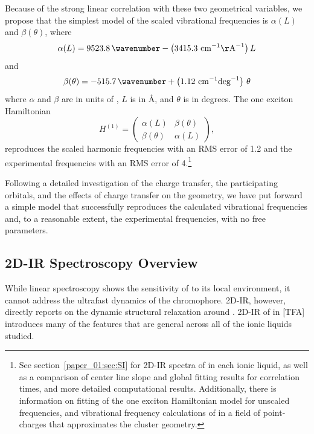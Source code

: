 {Because of the strong linear correlation with these two geometrical variables,  we propose that the simplest model of the scaled vibrational frequencies is \(\alpha(L)\) and \(\beta(\theta)\), where
\begin{equation}
  \alpha(L) = \SI{9523.8}{\wavenumber} - \left(3415.3~\mathrm{cm}^{-1} \mathrm{\AA}^{-1}\right) L %
\end{equation}
and
\begin{equation}
  \beta(\theta) = \SI{-515.7}{\wavenumber} + \left(1.12~\mathrm{cm}^{-1} \mathrm{deg}^{-1}\right)\, \theta  %
\end{equation}
where $\alpha$ and \(\beta\) are in units of \si{\wavenumber}, \(L\) is in \si{\angstrom}, and \(\theta\) is in degrees. The one exciton Hamiltonian
\begin{equation}
  H^{(1)} =
  \begin{pmatrix}
    \alpha(L) & \beta(\theta)\\
    \beta(\theta) & \alpha(L)
  \end{pmatrix},
\end{equation}
reproduces the scaled harmonic frequencies with an RMS error of \SI{1.2}{\wavenumber} and the experimental frequencies with an RMS error of \SI{4}{\wavenumber}.\footnote{See section~\ref{paper_01:sec:SI} for 2D-IR spectra of  in each ionic liquid, as well as a comparison of center line slope and global fitting results for correlation times, and more detailed computational results. Additionally, there is information on fitting of the one exciton Hamiltonian model for unscaled frequencies, and vibrational frequency calculations of  in a field of point-charges that approximates the cluster geometry.}

Following a detailed investigation of the charge transfer, the participating orbitals, and the effects of charge transfer on the  geometry, we have put forward a simple model that successfully reproduces the calculated vibrational frequencies and, to a reasonable extent, the experimental frequencies, with no free parameters.

\subsection{2D-IR Spectroscopy Overview}
\label{sec:anions_2DIR}

While linear spectroscopy shows the sensitivity of  to its local environment, it cannot address the ultrafast dynamics of the chromophore. 2D-IR, however, directly reports on the dynamic structural relaxation around . 2D-IR of  in \ce{[Im_{4,1}]}[TFA] introduces many of the features that are general across all of the ionic liquids studied.

}
